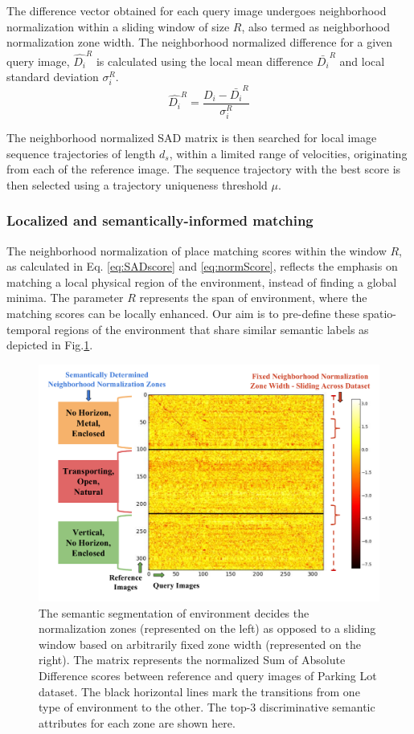 \documentclass[letterpaper, 10 pt, conference]{ieeeconf}  %
\begin{document}
The difference vector obtained for each query image undergoes neighborhood normalization within a sliding window of size $R$, also termed as neighborhood normalization zone width. The neighborhood normalized difference for a given query image, $\hat{D_i}^R$ is calculated using the local mean difference $\bar{D_i}^R$ and local standard deviation $\sigma_i^R$.
\begin{equation}
 \hat{D_i}^R = \frac{D_i-\bar{D_i}^R}{\sigma_i^R}
 \label{eq:normScore}
\end{equation}

The neighborhood normalized SAD matrix is then searched for local image sequence trajectories of length $d_s$, within a limited range of velocities, originating from each of the reference image. The sequence trajectory with the best score is then selected using a trajectory uniqueness threshold $\mu$.

\subsubsection{Localized and semantically-informed matching}
The neighborhood normalization of place matching scores within the window $R$, as calculated in Eq. \ref{eq:SADscore} and \ref{eq:normScore}, reflects the emphasis on matching a local physical region of the environment, instead of finding a global minima. The parameter $R$ represents the span of environment, where the matching scores can be locally enhanced. Our aim is to pre-define these spatio-temporal regions of the environment that share similar semantic labels as depicted in Fig.\ref{fig:SADmatRdisplay}. 

\begin{figure}
\centering
 \includegraphics[scale=0.35]{SADmat-NormalisationMethod-CameraReady}
 \caption{The semantic segmentation of environment decides the normalization zones (represented on the left) as opposed to a sliding window based on arbitrarily fixed zone width (represented on the right). The matrix represents the normalized Sum of Absolute Difference scores between reference and query images of Parking Lot dataset. The black horizontal lines mark the transitions from one type of environment to the other. The top-3 discriminative semantic attributes for each zone are shown here.}
 \label{fig:SADmatRdisplay}
\end{figure}
\end{document}
